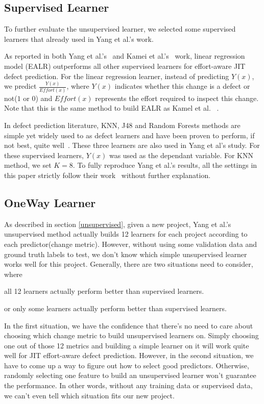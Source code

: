 \subsection{Supervised Learner}
To further evaluate the unsupervised learner, we selected some supervised learners
that already used in Yang et al.'s work. 

As reported in both Yang et al.'s~\cite{yang2016effort}
and Kamei et al.'s~\cite{kamei2013large} work, linear regression model (EALR) outperforms
all other supervised learners for effort-aware JIT defect prediction.
For the linear regression learner, instead of predicting $Y(x)$,
we predict $\frac{Y(x)}{Effort(x)}$, where $Y(x)$ indicates whether this change
is a defect or not($1$ or $0$) and $Effort(x)$ represents the effort required 
to inspect this change. Note that this is the same method to 
build EALR as Kamel et al. ~\cite{kamei2013large}.

In defect prediction literature, KNN, J48 and Random Forests methods are simple 
yet widely used to as defect learners and have been proven to perform, if not best, quite
well~\cite{lessmann2008benchmarking,menzies2007data,hall2012systematic}. These three
learners are also used in Yang et al's study. For these
supervised learners, $Y(x)$ was used as the dependant variable. 
For KNN method, we set $K=8$. To fully reproduce
Yang et al.'s results,  all the settings in this paper strictly follow
their work~\cite{yang2016effort} without further explanation.


\subsection{OneWay Learner}\label{OneWay}


As described in section \ref{unsupervised}, given a new project,
Yang et al.'s unsupervised method actually builds 12
learners for each project according to each predictor(change metric).
However, without using some validation data and ground truth labels to test,
we don't know which simple unsupervised learner works well for this project.
Generally, there are two situations need to consider, where

\bi
\item all 12 learners actually perform better than supervised learners.
\item or only some learners actually perform better than supervised learners.
\ei

In the first situation, we have the confidence that there's no need to
care about choosing which change metric to build unsupervised learners on.
Simply choosing one out of those 12 metrics and building a simple
learner on it will work quite well for JIT effort-aware defect prediction. 
However, in the second situation, we have to come up a way to
figure out how to select good predictors. Otherwise, randomly selecting
one feature to build an unsupervised learner won't guarantee the performance.
In other words, without any training data or supervised data, we can't even
tell which situation fits our new project.


